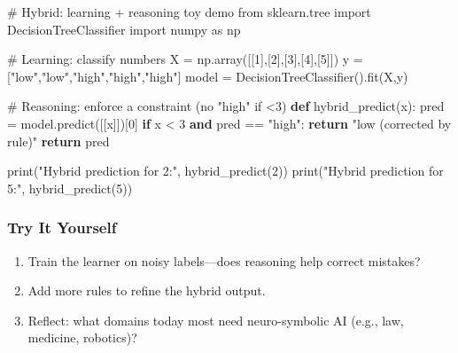 \documentclass[
  letterpaper,
  DIV=11,
  numbers=noendperiod]{scrreprt}
\newenvironment{Shaded}{\begin{snugshade}}{\end{snugshade}}
\newcommand{\BuiltInTok}[1]{\textcolor[rgb]{0.00,0.23,0.31}{#1}}
\newcommand{\CommentTok}[1]{\textcolor[rgb]{0.37,0.37,0.37}{#1}}
\newcommand{\ControlFlowTok}[1]{\textcolor[rgb]{0.00,0.23,0.31}{\textbf{#1}}}
\newcommand{\DecValTok}[1]{\textcolor[rgb]{0.68,0.00,0.00}{#1}}
\newcommand{\ImportTok}[1]{\textcolor[rgb]{0.00,0.46,0.62}{#1}}
\newcommand{\KeywordTok}[1]{\textcolor[rgb]{0.00,0.23,0.31}{\textbf{#1}}}
\newcommand{\NormalTok}[1]{\textcolor[rgb]{0.00,0.23,0.31}{#1}}
\newcommand{\OperatorTok}[1]{\textcolor[rgb]{0.37,0.37,0.37}{#1}}
\newcommand{\StringTok}[1]{\textcolor[rgb]{0.13,0.47,0.30}{#1}}
\providecommand{\tightlist}{%
  \setlength{\itemsep}{0pt}\setlength{\parskip}{0pt}}
\begin{document}
\begin{Shaded}
\begin{Highlighting}[]
\CommentTok{\# Hybrid: learning + reasoning toy demo}
\ImportTok{from}\NormalTok{ sklearn.tree }\ImportTok{import}\NormalTok{ DecisionTreeClassifier}
\ImportTok{import}\NormalTok{ numpy }\ImportTok{as}\NormalTok{ np}

\CommentTok{\# Learning: classify numbers}
\NormalTok{X }\OperatorTok{=}\NormalTok{ np.array([[}\DecValTok{1}\NormalTok{],[}\DecValTok{2}\NormalTok{],[}\DecValTok{3}\NormalTok{],[}\DecValTok{4}\NormalTok{],[}\DecValTok{5}\NormalTok{]])}
\NormalTok{y }\OperatorTok{=}\NormalTok{ [}\StringTok{"low"}\NormalTok{,}\StringTok{"low"}\NormalTok{,}\StringTok{"high"}\NormalTok{,}\StringTok{"high"}\NormalTok{,}\StringTok{"high"}\NormalTok{]}
\NormalTok{model }\OperatorTok{=}\NormalTok{ DecisionTreeClassifier().fit(X,y)}

\CommentTok{\# Reasoning: enforce a constraint (no "high" if \textless{}3)}
\KeywordTok{def}\NormalTok{ hybrid\_predict(x):}
\NormalTok{    pred }\OperatorTok{=}\NormalTok{ model.predict([[x]])[}\DecValTok{0}\NormalTok{]}
    \ControlFlowTok{if}\NormalTok{ x }\OperatorTok{\textless{}} \DecValTok{3} \KeywordTok{and}\NormalTok{ pred }\OperatorTok{==} \StringTok{"high"}\NormalTok{:}
        \ControlFlowTok{return} \StringTok{"low (corrected by rule)"}
    \ControlFlowTok{return}\NormalTok{ pred}

\BuiltInTok{print}\NormalTok{(}\StringTok{"Hybrid prediction for 2:"}\NormalTok{, hybrid\_predict(}\DecValTok{2}\NormalTok{))}
\BuiltInTok{print}\NormalTok{(}\StringTok{"Hybrid prediction for 5:"}\NormalTok{, hybrid\_predict(}\DecValTok{5}\NormalTok{))}
\end{Highlighting}
\end{Shaded}

\subsubsection{Try It Yourself}\label{try-it-yourself-57}

\begin{enumerate}
\def\labelenumi{\arabic{enumi}.}
\tightlist
\item
  Train the learner on noisy labels---does reasoning help correct
  mistakes?
\item
  Add more rules to refine the hybrid output.
\item
  Reflect: what domains today most need neuro-symbolic AI (e.g., law,
  medicine, robotics)?
\end{enumerate}
\end{document}

